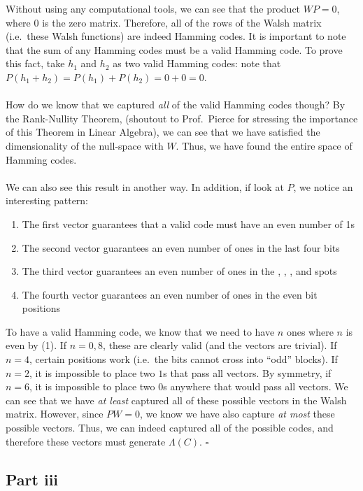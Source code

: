 \documentclass[letterpaper]{article}
\newcommand*{\QED}{\hfill\ensuremath{\square}}%
\begin{document}
Without using any computational tools, we can see that the product $ WP = 0 $, where $ 0 $ is the zero matrix.
Therefore, all of the rows of the Walsh matrix (i.e.\ these Walsh functions) are indeed Hamming codes.
It is important to note that the sum of any Hamming codes must be a valid Hamming code.
To prove this fact, take $ h_1 $ and $ h_2 $ as two valid Hamming codes: note that $ P(h_1 + h_2) = P(h_1) + P(h_2) = 0 + 0 = 0 $.
\\ \\
How do we know that we captured \textit{all} of the valid Hamming codes though?
By the Rank-Nullity Theorem, (shoutout to Prof.\ Pierce for stressing the importance of this Theorem in Linear Algebra), we can see that we have satisfied the dimensionality of the null-space with $ W $.
Thus, we have found the entire space of Hamming codes.
\\ \\
We can also see this result in another way.
In addition, if look at $ P $, we notice an interesting pattern:
\begin{enumerate}
    \item The first vector guarantees that a valid code must have an even number of 1s
    \item The second vector guarantees an even number of ones in the last four bits
    \item The third vector guarantees an even number of ones in the , , , and  spots
    \item The fourth vector guarantees an even number of ones in the even bit positions
\end{enumerate}

To have a valid Hamming code, we know that we need to have $ n $ ones where $ n $ is even by (1).
If $ n = 0, 8 $, these are clearly valid (and the vectors are trivial).
If $ n = 4 $, certain positions work (i.e.\ the bits cannot cross into ``odd'' blocks).
If $ n = 2 $, it is impossible to place two $ 1 $s that pass all vectors.
By symmetry, if $ n = 6 $, it is impossible to place two $ 0 $s anywhere that would pass all vectors.
We can see that we have \textit{at least} captured all of these possible vectors in the Walsh matrix.
However, since $ PW = 0 $, we know we have also capture \textit{at most} these possible vectors.
Thus, we can indeed captured all of the possible codes, and therefore these vectors must generate $ \Lambda(C) $.
\QED{}

\subsection{Part iii}
\label{subs:5Partiii}
\end{document}
